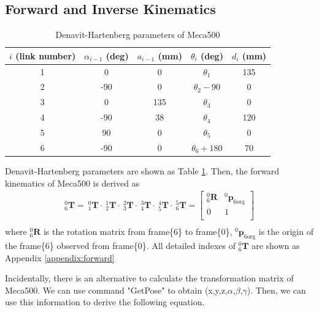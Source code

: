 \subsection{Forward and Inverse Kinematics}
\label{sec:forward}
\begin{table}[htbp]
\centering
\caption{Denavit-Hartenberg parameters of Meca500}
\label{tab:DHtable}
\begin{tabular}{ccccc} 
\hline \hline
$i$ (link number)		&$\alpha _{i-1}$ (deg)	&$a_{i-1}$ (mm)	& $\theta _i$ (deg)			&$d_i$ (mm)	\\
\hline
1   					&0    					&0				&$\theta _1$				&135 \\
2   					&-90   					&0				&$\theta _2-90$				&0 \\
3  						&0    					&135			&$\theta _3$ 				&0 \\
4   					&-90    				&38				&$\theta _4$ 				&120 \\
5   					&90   					&0				&$\theta _5$ 				&0 \\
6						&-90  					&0				&$\theta _6+180$ 				&70 \\
\hline\hline
\end{tabular}
\end{table}
\hspace*{6mm}Denavit-Hartenberg parameters are shown as Table \ref{tab:DHtable}. Then, the forward kinematics of Meca500 is derived as
\begin{equation}
\begin{split}
^0_6\mathbf{T} =
\ ^0_1\mathbf{T} \cdot \ ^1_2\mathbf{T} \cdot \ ^2_3\mathbf{T} \cdot \ ^3_4\mathbf{T} \cdot \ ^4_5\mathbf{T} \cdot \ ^5_6\mathbf{T} =
\begin{bmatrix}
^0_6\mathbf{R}	&^0\boldsymbol{p}_\mathrm{6org}\\
0				&1\\
\end{bmatrix}\\
\end{split}
\end{equation}\label{eq:translation matrix}
where $^0_6\mathbf{R}$ is the rotation matrix from frame\{6\} to frame\{0\}, $^0\boldsymbol{p}_\mathrm{6org}$ is the origin of the frame\{6\} observed from frame\{0\}. All detailed indexes of $^0_6\mathbf{T}$ are shown as Appendix \ref{appendix:forward}
\par
Incidentally, there is an alternative to calculate the transformation matrix of Meca500. We can use command "GetPose" to obtain (x,y,z,$\alpha$,$\beta$,$\gamma$). Then, we can use this information to derive the following equation.
